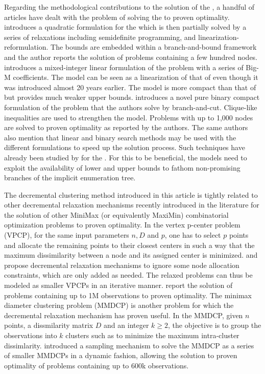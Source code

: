 \documentclass[ijoo,nonblindrev]{informs-ijoo}
\begin{document}
Regarding the methodological contributions to the solution of the \pDP{}, a handful of articles have dealt with the problem of solving the \pDP{} to proven optimality. \citet{Pisinger2006Upper} introduces a quadratic formulation for the \pDP{} which is then partially solved by a series of relaxations including semidefinite programming, and linearization-reformulation. The bounds are embedded within a branch-and-bound framework and the author reports the solution of problems containing a few hundred nodes. \citet{Kuby1987Programming} introduces a mixed-integer linear formulation of the problem with a series of Big-M coefficients. The model can be seen as a linearization of that of \citet{Pisinger2006Upper} even though it was introduced almost 20 years earlier. The model is more compact than that of \citet{Pisinger2006Upper} but provides much weaker upper bounds. \citet{Sayah2017new} introduces a novel pure binary compact formulation of the problem that the authors solve by branch-and-cut. Clique-like inequalities are used to strengthen the model. Problems with up to 1,000 nodes are solved to proven optimality as reported by the authors. The same authors also mention that linear and binary search methods may be used with the different formulations to speed up the solution process. Such techniques have already been studied by \citet{Chandrasekaran1981Location, Pisinger2006Upper} for the \pDP{}. For this to be beneficial, the models need to exploit the availability of lower and upper bounds to fathom non-promising branches of the implicit enumeration tree.

The decremental clustering method introduced in this article is tightly related to other decremental relaxation mechanisms recently introduced in the literature for the solution of other MiniMax (or equivalently MaxiMin) combinatorial optimization problems to proven optimality. In the vertex p-center problem (VPCP), for the same input parameters $n, D$ and $p$, one has to select $p$ points and allocate the remaining points to their closest centers in such a way that the maximum dissimilarity between a node and its assigned center is minimized. \citet{Chen2009New} and \citet{Contardo2019scalable} propose decremental relaxation mechanisms to ignore some node allocation constraints, which are only added as needed. The relaxed problems can thus be modeled as smaller VPCPs in an iterative manner. \citet{Contardo2019scalable} report the solution of problems containing up to 1M observations to proven optimality. The minimax diameter clustering problem (MMDCP) is another problem for which the decremental relaxation mechanism has proven useful. In the MMDCP, given $n$ points, a dissmilarity matrix $D$ and an integer $k\geq 2$, the objective is to group the observations into $k$ clusters such as to minimize the maximum intra-cluster dissimlarity. \citet{Aloise2018sampling} introduced a sampling mechanism to solve the MMDCP as a series of smaller MMDCPs in a dynamic fashion, allowing the solution to proven optimality of problems containing up to 600k observations.
\end{document}
